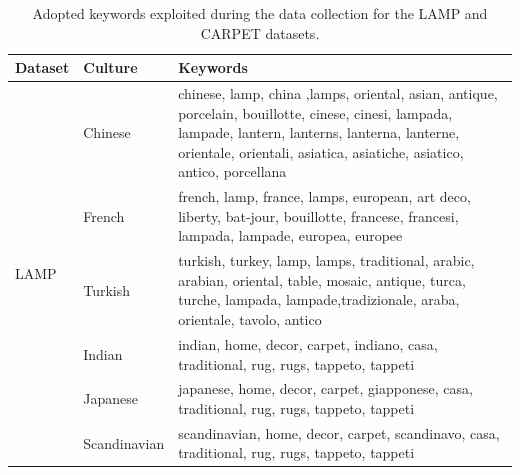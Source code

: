 \begin{table}
\footnotesize
\centering
\setlength{\tabcolsep}{0.1cm}
\renewcommand{\arraystretch}{1.5}
\begin{tabular}{l|l|p{12cm}}
\toprule
\textbf{Dataset} & \textbf{Culture} & \textbf{Keywords} \\
\midrule
\multirow{6}{*}{LAMP} & Chinese & chinese, lamp, china ,lamps, oriental, asian, antique, porcelain, bouillotte, cinese, cinesi, lampada, lampade, lantern, lanterns, lanterna, lanterne, orientale, orientali, asiatica, asiatiche, asiatico, antico, porcellana\\
\hhline{~--}
& French & french, lamp, france, lamps, european, art deco, liberty, bat-jour, bouillotte, francese, francesi, lampada, lampade, europea, europee\\
\hhline{~--}
& Turkish & turkish, turkey, lamp, lamps, traditional, arabic, arabian, oriental, table, mosaic, antique, turca, turche, lampada, lampade,tradizionale, araba, orientale, tavolo,  antico\\
\midrule
\multirow{3}{*}{CARPET} & Indian &  indian, home, decor, carpet, indiano, casa, traditional, rug, rugs, tappeto, tappeti \\
\hhline{~--}
& Japanese & japanese, home, decor, carpet, giapponese, casa, traditional, rug, rugs, tappeto, tappeti\\
\hhline{~--}
& Scandinavian & scandinavian, home, decor, carpet, scandinavo, casa, traditional, rug, rugs, tappeto, tappeti \\
\bottomrule
\end{tabular}
\caption{Adopted keywords exploited during the data collection for the LAMP and CARPET datasets.}
\label{ch2:tab:casestudy:2}
\end{table}
%
